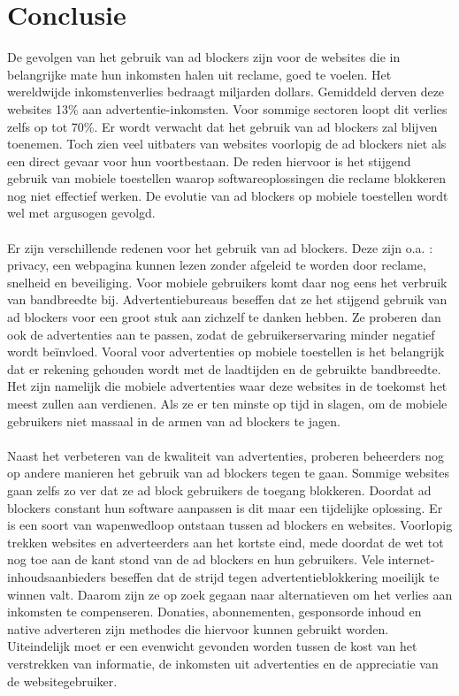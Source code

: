 \documentclass[pdftex,a4paper,12pt,twoside]{report}
\begin{document}
\chapter{Conclusie}
\label{ch:conclusie}
De gevolgen van het gebruik van ad blockers zijn voor de websites die in belangrijke mate hun inkomsten halen uit reclame, goed te voelen. Het wereldwijde inkomstenverlies bedraagt miljarden dollars. Gemiddeld derven deze websites 13\% aan advertentie-inkomsten. Voor sommige sectoren loopt dit verlies zelfs op tot 70\%. Er wordt verwacht dat het gebruik van ad blockers zal blijven toenemen. Toch zien veel uitbaters van websites voorlopig de ad blockers niet als een direct gevaar voor hun voortbestaan. De reden hiervoor is het stijgend gebruik van mobiele toestellen waarop softwareoplossingen die reclame blokkeren nog niet effectief werken. De evolutie van ad blockers op mobiele toestellen wordt wel met argusogen gevolgd. 
\\
\\
Er zijn verschillende redenen voor het gebruik van ad blockers. Deze zijn o.a. : privacy, een webpagina kunnen lezen zonder afgeleid te worden door reclame, snelheid en beveiliging. Voor mobiele gebruikers komt daar nog eens het verbruik van bandbreedte bij. Advertentiebureaus beseffen dat ze het stijgend gebruik van ad blockers voor een groot stuk aan zichzelf te danken hebben. Ze proberen dan ook de advertenties aan te passen, zodat de gebruikerservaring minder negatief wordt beïnvloed. Vooral voor advertenties op mobiele toestellen is het belangrijk dat er rekening gehouden wordt met de laadtijden en de gebruikte bandbreedte. Het zijn namelijk die mobiele advertenties waar deze websites in de toekomst het meest zullen aan verdienen. Als ze er ten minste op tijd in slagen, om de mobiele gebruikers niet massaal in de armen van ad blockers te jagen.
\\
\\
Naast het verbeteren van de kwaliteit van advertenties, proberen beheerders nog op andere manieren het gebruik van ad blockers tegen te gaan. Sommige websites gaan zelfs zo ver dat ze ad block gebruikers de toegang blokkeren. Doordat ad blockers constant hun software aanpassen is dit maar een tijdelijke oplossing. Er is een soort van wapenwedloop ontstaan tussen ad blockers en websites. Voorlopig trekken websites en adverteerders aan het kortste eind, mede doordat de wet tot nog toe aan de kant stond van de ad blockers en hun gebruikers. 
Vele internet-inhoudsaanbieders beseffen dat de strijd tegen advertentieblokkering moeilijk te winnen valt. Daarom zijn ze op zoek gegaan naar alternatieven om het verlies aan inkomsten te compenseren. Donaties, abonnementen, gesponsorde inhoud en native adverteren zijn methodes die hiervoor kunnen gebruikt worden. 
Uiteindelijk moet er een evenwicht gevonden worden tussen de kost van het verstrekken van informatie, de inkomsten uit advertenties en de appreciatie van de websitegebruiker.
\end{document}
